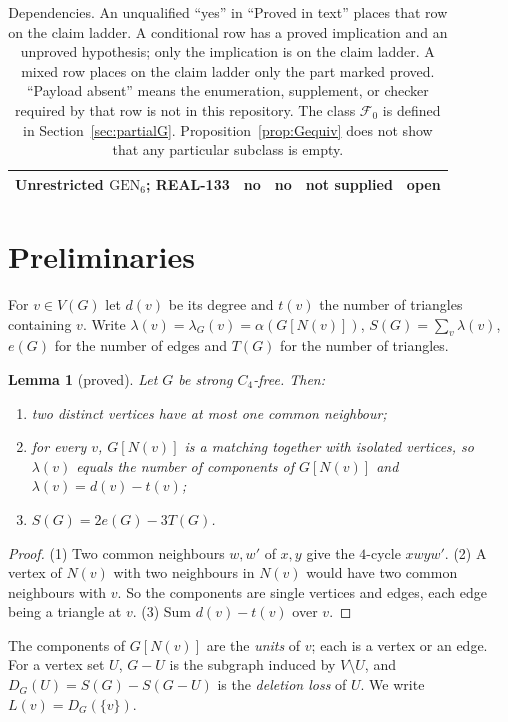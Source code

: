 \documentclass[11pt]{amsart}
\newtheorem{lemma}[theorem]{Lemma}
\theoremstyle{definition}
\theoremstyle{remark}
\newcommand{\GEN}{\mathrm{GEN}}
\begin{document}
\begin{table}[ht]
\begin{tabular}{@{}p{3.85cm}p{2.15cm}p{2.45cm}p{2.45cm}p{2.55cm}@{}}
Unrestricted $\GEN_6$; REAL-133 & no & no & not supplied & open\\
\bottomrule
\end{tabular}
\caption{Dependencies. An unqualified ``yes'' in ``Proved in text'' places that row on the claim ladder. A conditional row has a proved implication and an unproved hypothesis; only the implication is on the claim ladder. A mixed row places on the claim ladder only the part marked proved. ``Payload absent'' means the enumeration, supplement, or checker required by that row is not in this repository. The class $\mathcal F_0$ is defined in Section~\ref{sec:partialG}. Proposition~\ref{prop:Gequiv} does not show that any particular subclass is empty.}\label{tab:dep}
\end{table}

\section{Preliminaries}\label{sec:prelim}

For $v\in V(G)$ let $d(v)$ be its degree and $t(v)$ the number of triangles containing $v$. Write $\lambda(v)=\lambda_G(v)=\alpha(G[N(v)])$, $S(G)=\sum_v\lambda(v)$, $e(G)$ for the number of edges and $T(G)$ for the number of triangles.

\begin{lemma}[proved]\label{lem:basic}
Let $G$ be strong $C_4$-free. Then:
\begin{enumerate}
\item two distinct vertices have at most one common neighbour;
\item for every $v$, $G[N(v)]$ is a matching together with isolated vertices, so $\lambda(v)$ equals the number of components of $G[N(v)]$ and $\lambda(v)=d(v)-t(v)$;
\item $S(G)=2e(G)-3T(G)$.
\end{enumerate}
\end{lemma}

\begin{proof}
(1) Two common neighbours $w,w'$ of $x,y$ give the $4$-cycle $xwyw'$. (2) A vertex of $N(v)$ with two neighbours in $N(v)$ would have two common neighbours with $v$. So the components are single vertices and edges, each edge being a triangle at $v$. (3) Sum $d(v)-t(v)$ over $v$.
\end{proof}

The components of $G[N(v)]$ are the \emph{units} of $v$; each is a vertex or an edge. For a vertex set $U$, $G-U$ is the subgraph induced by $V\setminus U$, and $D_G(U)=S(G)-S(G-U)$ is the \emph{deletion loss} of $U$. We write $L(v)=D_G(\{v\})$.
\end{document}
